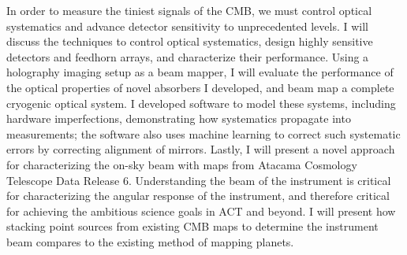 \documentclass{ucetd}
\begin{document}
In order to measure the tiniest signals of the CMB, we must control optical systematics and advance detector sensitivity to unprecedented levels. I will discuss the techniques to control optical systematics, design highly sensitive detectors and feedhorn arrays, and characterize their performance. Using a holography imaging setup as a beam mapper, I will evaluate the performance of the optical properties of novel absorbers I developed, and beam map a complete cryogenic optical system. I developed software to model these systems,  including hardware imperfections, demonstrating how systematics propagate into measurements; the software also uses machine learning to correct such systematic errors by correcting alignment of mirrors.  Lastly, I will present a novel approach for characterizing the on-sky beam with maps from Atacama Cosmology Telescope Data Release 6.  Understanding the beam of the instrument is critical for characterizing the angular response of the instrument, and therefore critical for achieving the ambitious science goals in ACT and beyond.  I will present how stacking point sources from existing CMB maps to determine the instrument beam compares to the existing method of mapping planets.

\mainmatter











\appendix







\acknowledgments

    
\end{document}
